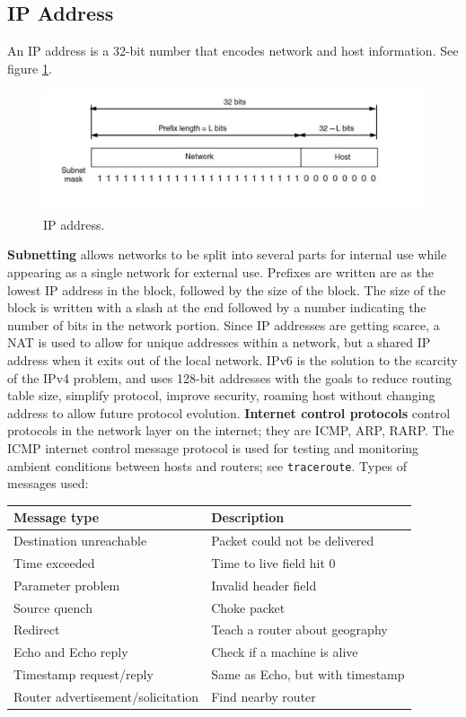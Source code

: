 \documentclass[twoside]{article}
\begin{document}
\subsection{IP Address}
An IP address is a 32-bit number that encodes network and host information. See
figure \ref{fig:ip-address}.
\begin{figure}
  \includegraphics[width=\linewidth]{ip-address.png}
  \caption{IP address.}
  \label{fig:ip-address}
\end{figure}
\textbf{Subnetting} allows networks to be split into several parts for internal
use while appearing as a single network for external use. Prefixes are written
are as the lowest IP address in the block, followed by the size of the block.
The size of the block is written with a slash at the end followed by a number
indicating the number of bits in the network portion. Since IP addresses are 
getting scarce, a NAT is used to allow for unique addresses within a network, 
but a shared IP address when it exits out of the local network. IPv6 is the 
solution to the scarcity of the IPv4 problem, and uses 128-bit addresses with
the goals to reduce routing table size, simplify protocol, improve security,
roaming host without changing address to allow future protocol evolution. 
\textbf{Internet control protocols} control protocols in the network layer on
the internet; they are ICMP, ARP, RARP. The ICMP internet control message 
protocol is used for testing and monitoring ambient conditions between hosts
and routers; see \texttt{traceroute}. Types of messages used:
\begin{center}
    \begin{tabular}{| l | l |}
    \hline \textbf{Message type} & \textbf{Description} \\ \hline
    \hline Destination unreachable & Packet could not be delivered \\ \hline
    \hline Time exceeded & Time to live field hit 0 \\ \hline
    \hline Parameter problem & Invalid header field \\ \hline
    \hline Source quench & Choke packet \\ \hline
    \hline Redirect & Teach a router about geography \\ \hline
    \hline Echo and Echo reply & Check if a machine is alive \\ \hline
    \hline Timestamp request/reply & Same as Echo, but with timestamp \\ \hline
    \hline Router advertisement/solicitation & Find nearby router \\ \hline
    \end{tabular}
\end{center}
\end{document}
